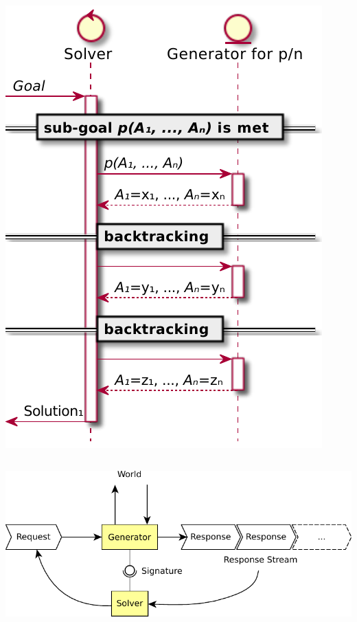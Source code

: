 \documentclass[presentation]{beamer}
\begin{document}
\begin{frame}[allowframebreaks]
\begin{columns}
\begin{column}{.4\linewidth}
            \includegraphics[width=\linewidth]{img/solver-generator.pdf}
        \end{column}
    \end{columns}

    \framebreak

    \begin{center}
        \includegraphics[width=.6\linewidth]{img/generator.pdf}
    \end{center}


\end{frame}
\end{document}
